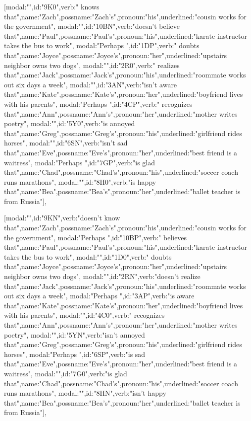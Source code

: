 [{modal:"",id:"9K0",verb:" knows that",name:"Zach",possname:"Zach's",pronoun:"his",underlined:"cousin works for the government"},
{modal:"",id:"10BN",verb:"doesn't believe that",name:"Paul",possname:"Paul's",pronoun:"his",underlined:"karate instructor takes the bus to work"},
{modal:"Perhaps ",id:"1DP",verb:" doubts that",name:"Joyce",possname:"Joyce's",pronoun:"her",underlined:"upstairs neighbor owns two dogs"},
{modal:"",id:"2R0",verb:" realizes that",name:"Jack",possname:"Jack's",pronoun:"his",underlined:"roommate works out six days a week"},
{modal:"",id:"3AN",verb:"isn't aware that",name:"Kate",possname:"Kate's",pronoun:"her",underlined:"boyfriend lives with his parents"},
{modal:"Perhaps ",id:"4CP",verb:" recognizes that",name:"Ann",possname:"Ann's",pronoun:"her",underlined:"mother writes poetry"},
{modal:"",id:"5Y0",verb:"is annoyed that",name:"Greg",possname:"Greg's",pronoun:"his",underlined:"girlfriend rides horses"},
{modal:"",id:"6SN",verb:"isn't sad that",name:"Eve",possname:"Eve's",pronoun:"her",underlined:"best friend is a waitress"},
{modal:"Perhaps ",id:"7GP",verb:"is glad that",name:"Chad",possname:"Chad's",pronoun:"his",underlined:"soccer coach runs marathons"},
{modal:"",id:"8H0",verb:"is happy that",name:"Bea",possname:"Bea's",pronoun:"her",underlined:"ballet teacher is from Russia"}],

[{modal:"",id:"9KN",verb:"doesn't know that",name:"Zach",possname:"Zach's",pronoun:"his",underlined:"cousin works for the government"},
{modal:"Perhaps ",id:"10BP",verb:" believes that",name:"Paul",possname:"Paul's",pronoun:"his",underlined:"karate instructor takes the bus to work"},
{modal:"",id:"1D0",verb:" doubts that",name:"Joyce",possname:"Joyce's",pronoun:"her",underlined:"upstairs neighbor owns two dogs"},
{modal:"",id:"2RN",verb:"doesn't realize that",name:"Jack",possname:"Jack's",pronoun:"his",underlined:"roommate works out six days a week"},
{modal:"Perhaps ",id:"3AP",verb:"is aware that",name:"Kate",possname:"Kate's",pronoun:"her",underlined:"boyfriend lives with his parents"},
{modal:"",id:"4C0",verb:" recognizes that",name:"Ann",possname:"Ann's",pronoun:"her",underlined:"mother writes poetry"},
{modal:"",id:"5YN",verb:"isn't annoyed that",name:"Greg",possname:"Greg's",pronoun:"his",underlined:"girlfriend rides horses"},
{modal:"Perhaps ",id:"6SP",verb:"is sad that",name:"Eve",possname:"Eve's",pronoun:"her",underlined:"best friend is a waitress"},
{modal:"",id:"7G0",verb:"is glad that",name:"Chad",possname:"Chad's",pronoun:"his",underlined:"soccer coach runs marathons"},
{modal:"",id:"8HN",verb:"isn't happy that",name:"Bea",possname:"Bea's",pronoun:"her",underlined:"ballet teacher is from Russia"}],

